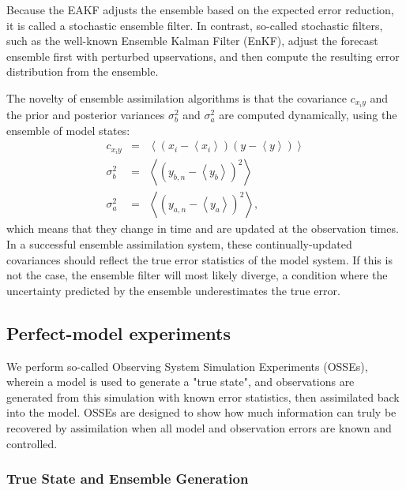 Because the EAKF adjusts the ensemble based on the expected error reduction, it is called a stochastic ensemble filter.
In contrast, so-called stochastic filters, such as the well-known Ensemble Kalman Filter (EnKF), adjust the forecast ensemble first with perturbed upservations, and then compute the resulting error distribution from the ensemble.

The novelty of ensemble assimilation algorithms is that the covariance $c_{x_iy}$ and the prior and posterior variances $\sigma_b^2$ and $\sigma_a^2$ are computed dynamically, using the ensemble of model states:
\begin{eqnarray}
c_{x_iy} &=& 
\left<
\left( x_i - \left< x_i \right>   \right)
\left( y - \left< y \right>   \right)
\right> 
\label{eq:covariance} \\
%
\sigma_b^2 &=& 
\left<
\left( y_{b,n} - \left< y_b \right>   \right)^2
\right>  
\label{eq:sigma_b} \\
%
\sigma_a^2 &=& 
\left<
\left( y_{a,n} - \left< y_a \right>   \right)^2
\right>,  
\label{eq:sigma_a} 
\end{eqnarray}
%
which means that they change in time and are updated at the observation times.
In a successful ensemble assimilation system, these continually-updated covariances should reflect the true error statistics of the model system.
If this is not the case, the ensemble filter will most likely diverge, a condition where the uncertainty predicted by the ensemble underestimates the true error.



\subsection{Perfect-model experiments}
\label{sec:experiments}

We perform so-called Observing System Simulation Experiments (OSSEs), wherein a model is used to generate a "true state", and observations are generated from this simulation with known error statistics, then assimilated back into the model.
OSSEs are designed to show how much information can truly be recovered by assimilation when all model and observation errors are known and controlled. 

\subsubsection{True State and Ensemble Generation}

